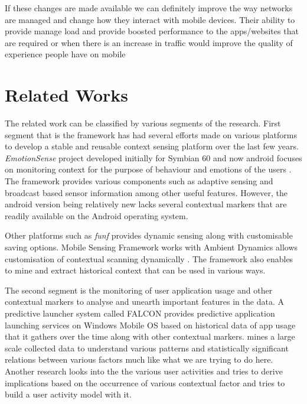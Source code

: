 \documentclass[prodmode,acmtecs]{acmsmall}
\begin{document}
If these changes are made available we can definitely improve the way networks are managed and change how they interact with mobile devices. Their ability to provide manage load and provide boosted performance to the apps/websites that are required or when there is an increase in traffic would improve the quality of experience people have on mobile

\section{Related Works}

The related work can be classified by various segments of the research. First segment that is the framework has had several efforts made on various platforms to develop a stable and reusable context sensing platform over the last few years. \textit{EmotionSense} project developed initially for Symbian 60 and now android focuses on monitoring context for the purpose of behaviour and emotions of the users \cite{rachuri2010emotionsense}. The framework provides various components such as adaptive sensing and broadcast based sensor information among other useful features. However, the android version being relatively new lacks several contextual markers that are readily available on the Android operating system.

Other platforms such as \textit{funf} provides dynamic sensing along with customisable saving options. Mobile Sensing Framework works with Ambient Dynamics allows customisation of contextual scanning dynamically \cite{novakextensible2013}. The framework also enables to mine and extract historical context that can be used in various ways.

The second segment is the monitoring of user application usage and other contextual markers to analyse and unearth important features in the data. A predictive launcher system called FALCON \cite{yan2012fast} provides predictive application launching services on Windows Mobile OS based on historical data of app usage that it gathers over the time along with other contextual markers. \cite{do2010their} mines a large scale collected data to understand various patterns and statistically significant relations between various factors much like what we are trying to do here. Another research  looks into the the various user activities and tries to derive implications based on the occurrence of various contextual factor and tries to build a user activity model with it.
\end{document}
